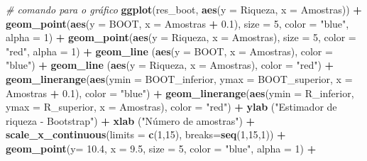 \documentclass[
]{book}
\newenvironment{Shaded}{\begin{snugshade}}{\end{snugshade}}
\newcommand{\CommentTok}[1]{\textcolor[rgb]{0.56,0.35,0.01}{\textit{#1}}}
\newcommand{\DataTypeTok}[1]{\textcolor[rgb]{0.13,0.29,0.53}{#1}}
\newcommand{\DecValTok}[1]{\textcolor[rgb]{0.00,0.00,0.81}{#1}}
\newcommand{\FloatTok}[1]{\textcolor[rgb]{0.00,0.00,0.81}{#1}}
\newcommand{\KeywordTok}[1]{\textcolor[rgb]{0.13,0.29,0.53}{\textbf{#1}}}
\newcommand{\NormalTok}[1]{#1}
\newcommand{\OperatorTok}[1]{\textcolor[rgb]{0.81,0.36,0.00}{\textbf{#1}}}
\newcommand{\StringTok}[1]{\textcolor[rgb]{0.31,0.60,0.02}{#1}}
\begin{document}
\begin{Shaded}
\begin{Highlighting}[]
\CommentTok{# comando para o gráfico}
\KeywordTok{ggplot}\NormalTok{(res_boot, }\KeywordTok{aes}\NormalTok{(}\DataTypeTok{y =}\NormalTok{ Riqueza, }\DataTypeTok{x =}\NormalTok{ Amostras)) }\OperatorTok{+}
\StringTok{  }\KeywordTok{geom_point}\NormalTok{(}\KeywordTok{aes}\NormalTok{(}\DataTypeTok{y =}\NormalTok{ BOOT, }\DataTypeTok{x =}\NormalTok{ Amostras }\OperatorTok{+}\StringTok{ }\FloatTok{0.1}\NormalTok{), }\DataTypeTok{size =} \DecValTok{5}\NormalTok{, }\DataTypeTok{color =} \StringTok{"blue"}\NormalTok{, }\DataTypeTok{alpha =} \DecValTok{1}\NormalTok{) }\OperatorTok{+}
\StringTok{  }\KeywordTok{geom_point}\NormalTok{(}\KeywordTok{aes}\NormalTok{(}\DataTypeTok{y =}\NormalTok{ Riqueza, }\DataTypeTok{x =}\NormalTok{ Amostras), }\DataTypeTok{size =} \DecValTok{5}\NormalTok{, }\DataTypeTok{color =} \StringTok{"red"}\NormalTok{, }\DataTypeTok{alpha =} \DecValTok{1}\NormalTok{) }\OperatorTok{+}
\StringTok{  }\KeywordTok{geom_line}\NormalTok{ (}\KeywordTok{aes}\NormalTok{(}\DataTypeTok{y =}\NormalTok{ BOOT, }\DataTypeTok{x =}\NormalTok{ Amostras), }\DataTypeTok{color =} \StringTok{"blue"}\NormalTok{) }\OperatorTok{+}
\StringTok{  }\KeywordTok{geom_line}\NormalTok{ (}\KeywordTok{aes}\NormalTok{(}\DataTypeTok{y =}\NormalTok{ Riqueza, }\DataTypeTok{x =}\NormalTok{ Amostras), }\DataTypeTok{color =} \StringTok{"red"}\NormalTok{) }\OperatorTok{+}
\StringTok{  }\KeywordTok{geom_linerange}\NormalTok{(}\KeywordTok{aes}\NormalTok{(}\DataTypeTok{ymin =}\NormalTok{ BOOT_inferior, }\DataTypeTok{ymax =}\NormalTok{ BOOT_superior, }\DataTypeTok{x =}\NormalTok{ Amostras }\OperatorTok{+}\StringTok{ }\FloatTok{0.1}\NormalTok{),}
 \DataTypeTok{color =} \StringTok{"blue"}\NormalTok{) }\OperatorTok{+}
\StringTok{  }\KeywordTok{geom_linerange}\NormalTok{(}\KeywordTok{aes}\NormalTok{(}\DataTypeTok{ymin =}\NormalTok{ R_inferior, }\DataTypeTok{ymax =}\NormalTok{ R_superior, }\DataTypeTok{x =}\NormalTok{ Amostras), }\DataTypeTok{color =} \StringTok{"red"}\NormalTok{) }\OperatorTok{+}
\StringTok{  }\KeywordTok{ylab}\NormalTok{ (}\StringTok{"Estimador de riqueza - Bootstrap"}\NormalTok{) }\OperatorTok{+}
\StringTok{  }\KeywordTok{xlab}\NormalTok{ (}\StringTok{"Número de amostras"}\NormalTok{) }\OperatorTok{+}
\StringTok{  }\KeywordTok{scale_x_continuous}\NormalTok{(}\DataTypeTok{limits =} \KeywordTok{c}\NormalTok{(}\DecValTok{1}\NormalTok{,}\DecValTok{15}\NormalTok{), }\DataTypeTok{breaks=}\KeywordTok{seq}\NormalTok{(}\DecValTok{1}\NormalTok{,}\DecValTok{15}\NormalTok{,}\DecValTok{1}\NormalTok{)) }\OperatorTok{+}
\StringTok{  }\KeywordTok{geom_point}\NormalTok{(}\DataTypeTok{y=} \FloatTok{10.4}\NormalTok{, }\DataTypeTok{x =} \FloatTok{9.5}\NormalTok{, }\DataTypeTok{size =} \DecValTok{5}\NormalTok{, }\DataTypeTok{color =} \StringTok{"blue"}\NormalTok{, }\DataTypeTok{alpha =} \DecValTok{1}\NormalTok{) }\OperatorTok{+}\StringTok{ }

\end{Highlighting}
\end{Shaded}
\end{document}
